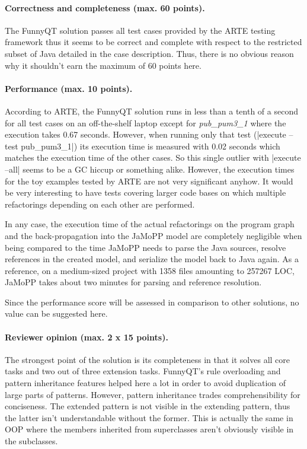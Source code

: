 \documentclass[submission]{eptcs}
\newcommand{\code}{\clojureinline}
\begin{document}
\paragraph{Correctness and completeness (max. 60 points).}

The FunnyQT solution passes all test cases provided by the ARTE testing
framework thus it seems to be correct and complete with respect to the
restricted subset of Java detailed in the case description.  Thus, there is no
obvious reason why it shouldn't earn the maximum of 60 points here.


\paragraph{Performance (max. 10 points).}

According to ARTE, the FunnyQT solution runs in less than a tenth of a second
for all test cases on an off-the-shelf laptop except for \textit{pub\_pum3\_1}
where the execution takes 0.67 seconds.  However, when running only that test
(\code|execute --test pub_pum3_1|) its execution time is measured with 0.02
seconds which matches the execution time of the other cases.  So this single
outlier with \code|execute --all| seems to be a GC hiccup or something alike.
However, the execution times for the toy examples tested by ARTE are not very
significant anyhow.  It would be very interesting to have tests covering larger
code bases on which multiple refactorings depending on each other are
performed.

In any case, the execution time of the actual refactorings on the program graph
and the back-propagation into the JaMoPP model are completely negligible when
being compared to the time JaMoPP needs to parse the Java sources, resolve
references in the created model, and serialize the model back to Java again.
As a reference, on a medium-sized project with 1358 files amounting to 257267
LOC, JaMoPP takes about two minutes for parsing and reference resolution.

Since the performance score will be assessed in comparison to other solutions,
no value can be suggested here.


\paragraph{Reviewer opinion (max. 2 x 15 points).}

The strongest point of the solution is its completeness in that it solves all
core tasks and two out of three extension tasks.  FunnyQT's rule overloading
and pattern inheritance features helped here a lot in order to avoid
duplication of large parts of patterns.  However, pattern inheritance trades
comprehensibility for conciseness.  The extended pattern is not visible in the
extending pattern, thus the latter isn't understandable without the former.
This is actually the same in OOP where the members inherited from superclasses
aren't obviously visible in the subclasses.
\end{document}
